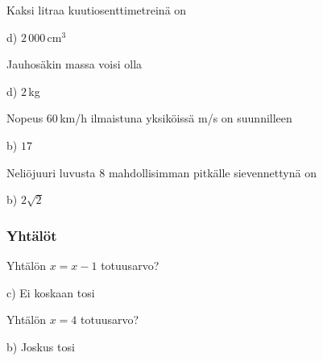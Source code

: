 \begin{tehtava}
Kaksi litraa kuutiosenttimetreinä on	
	\begin{vastaus}
	d) $2\,000$\,cm$^3$
	\end{vastaus}
\end{tehtava}

\begin{tehtava}
Jauhosäkin massa voisi olla
	\begin{vastaus}
	d) $2$\,kg
	\end{vastaus}
\end{tehtava}

\begin{tehtava}
Nopeus $60$\,km/h ilmaistuna yksiköissä m/s on suunnilleen
	\begin{vastaus}
	b) $17$
	\end{vastaus}
\end{tehtava}

\begin{tehtava}
Neliöjuuri luvusta $8$ mahdollisimman pitkälle sievennettynä on
  \begin{vastaus}
	 b) $2\sqrt{2}$
    \end{vastaus}
\end{tehtava}


\subsubsection*{Yhtälöt}


\begin{tehtava}
Yhtälön $x = x-1$ totuusarvo?
\begin{vastaus}
c) Ei koskaan tosi
\end{vastaus}
\end{tehtava}

\begin{tehtava}
Yhtälön $x = 4$ totuusarvo?
\begin{vastaus}
b) Joskus tosi
\end{vastaus}
\end{tehtava}

